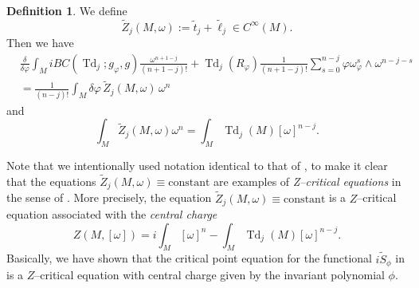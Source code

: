 \documentclass[12pt,reqno,a4paper]{amsart}
\numberwithin{equation}{section}
\DeclareMathOperator{\Td}{Td}
\theoremstyle{definition}
\newtheorem{definition}{Definition}
\theoremstyle{remark}
\begin{document}
\begin{definition}
We define
\begin{equation*}
\widetilde{Z}_j(M,\omega) := \widetilde{t}_j+\widetilde{\ell}_j\in C^\infty(M).
\end{equation*}
Then we have
\begin{align}\label{quilvar}
&\frac{\delta}{\delta\varphi} \int_M iBC(\Td_j;g_{\varphi},g)\frac{\omega^{n+1-j}}{(n+1-j)!}+\Td_{j}(R_\varphi)\frac{1}{(n+1-j)!}\sum^{n-j}_{s=0}\varphi \omega_{\varphi}^s\wedge \omega^{n-j-s}\nonumber\\
&=\frac{1}{(n-j)!}\int_M \delta\varphi \,\widetilde{Z}_j(M,\omega)\, \omega^n
\end{align}
and
\begin{equation*}
\int_M \widetilde{Z}_j(M,\omega) \omega^n = \int_M \Td_j(M) [\omega]^{n-j}.
\end{equation*}
\end{definition}

Note that we intentionally used notation identical to that of \cite{dervan2023universal}, to make it clear that the equations $\widetilde{Z}_j(M,\omega)\equiv \mathrm{constant}$ are examples of \textit{Z--critical equations} in the sense of \cite[Definition 2.4]{dervan2023universal}. More precisely, the equation  $\widetilde{Z}_j(M,\omega)\equiv \mathrm{constant}$ is a $Z$--critical equation associated with the \textit{central charge}
\begin{equation*}
Z(M,[\omega])=i\int_M [\omega]^{n}  -\int_M \Td_j(M)[\omega]^{n-j}.
\end{equation*}
Basically, we have shown that the critical point equation for the functional $i\widetilde{S}_\phi$ in \cite[Remark~2]{eum2025partition} is a $Z$--critical equation with central charge given by the invariant polynomial $\phi$.
\end{document}
